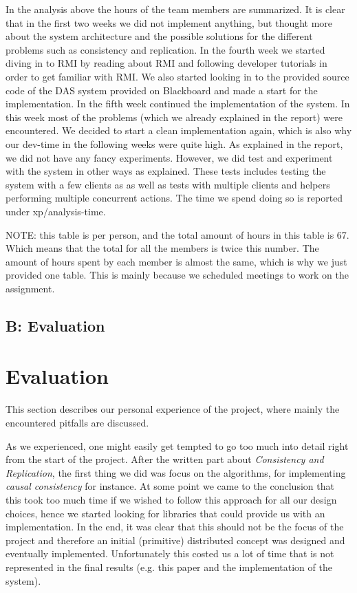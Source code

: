 In the analysis above the hours of the team members are summarized. 
It is clear that in the first two weeks we did not implement anything, but thought more about the system architecture and the possible solutions for the different problems such as consistency and replication.
In the fourth week we started diving in to RMI by reading about RMI and following developer tutorials in order to get familiar with  RMI.
We also started looking in to the provided source code of the DAS system provided on Blackboard and made a start for the implementation.
In the fifth week continued the implementation of the system.
In this week most of the problems (which we already explained in the report) were encountered. 
We decided to start a clean implementation again, which is also why our dev-time in the following weeks were quite high.
As explained in the report, we did not have any fancy experiments. 
However, we did test and experiment with the system in other ways as explained.
These tests includes testing the system with a few clients as as well as tests with multiple clients and helpers performing multiple concurrent actions.
The time we spend doing so is reported under xp/analysis-time.

NOTE: this table is per person, and the total amount of hours in this table is 67.
Which means that the total for all the members is twice this number.
The amount of hours spent by each member is almost the same, which is why we just provided one table.
This is mainly because we scheduled meetings to work on the assignment.

\subsection{B: Evaluation}

 \section{Evaluation}
 This section describes our personal experience of the project, where mainly the encountered pitfalls are discussed.

As we experienced, one might easily get tempted to go too much into detail right from the start of the project.
After the written part about \emph{Consistency and Replication}, the first thing we did was focus on the algorithms, for implementing \emph{causal consistency} for instance. 
At some point we came to the conclusion that this took too much time if we wished to follow this approach for all our design choices, hence we started looking for libraries that could provide us with an implementation. 
In the end, it was clear that this should not be the focus of the project and therefore an initial (primitive) distributed concept was designed and eventually implemented. 
Unfortunately this costed us a lot of time that is not represented in the final results (e.g. this paper and the implementation of the system).

